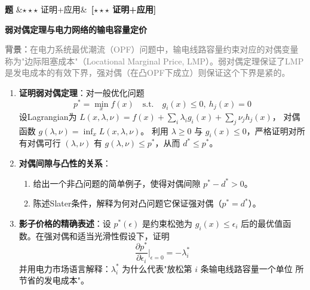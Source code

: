 \documentclass[12pt, a4paper]{article}
\newcounter{probcnt}
\newenvironment{problem}[1][]{%
  \stepcounter{probcnt}
  \begin{mdframed}[linecolor=black!30, backgroundcolor=gray!4,
    innertopmargin=8pt, innerbottommargin=8pt,
    innerleftmargin=10pt, innerrightmargin=10pt,
    skipabove=10pt, skipbelow=4pt]
  \noindent\textbf{题 \theprobcnt}\ifx&#1&\else\ \textbf{[#1]}\fi\quad
}{%
  \end{mdframed}
}
\newenvironment{subproblems}{%
  \begin{enumerate}[label=(\alph*), leftmargin=1.5em, topsep=4pt, itemsep=2pt]
}{%
  \end{enumerate}
}
\newcommand{\context}[1]{\smallskip\noindent\textcolor{gray}{\small \textbf{背景：}#1}\smallskip}
\begin{document}
\begin{problem}[$\star\star\star$ 证明+应用]
\textbf{弱对偶定理与电力网络的输电容量定价}

\context{在电力系统最优潮流（OPF）问题中，输电线路容量约束对应的对偶变量称为"边际阻塞成本"（Locational Marginal Price, LMP）。弱对偶定理保证了LMP是发电成本的有效下界，强对偶（在凸OPF下成立）则保证这个下界是紧的。}

\begin{subproblems}
  \item \textbf{证明弱对偶定理}：对一般优化问题
        \[
          p^* = \min_x f(x) \quad \text{s.t.} \quad g_i(x) \leq 0,\ h_j(x) = 0
        \]
        设Lagrangian为 $L(x,\lambda,\nu) = f(x) + \sum_i \lambda_i g_i(x) + \sum_j \nu_j h_j(x)$，
        对偶函数 $g(\lambda,\nu) = \inf_x L(x,\lambda,\nu)$。
        利用 $\lambda \geq 0$ 与 $g_i(x) \leq 0$，严格证明对所有对偶可行 $(\lambda, \nu)$ 有
        $g(\lambda, \nu) \leq p^*$，从而 $d^* \leq p^*$。

  \item \textbf{对偶间隙与凸性的关系}：
        \begin{enumerate}[label=(\roman*)]
          \item 给出一个非凸问题的简单例子，使得对偶间隙 $p^* - d^* > 0$。
          \item 陈述Slater条件，解释为何对凸问题它保证强对偶（$p^* = d^*$）。
        \end{enumerate}

  \item \textbf{影子价格的精确表述}：设 $p^*(\epsilon)$ 是约束松弛为 $g_i(x) \leq \epsilon_i$
        后的最优值函数。在强对偶和适当光滑性假设下，证明
        \[
          \frac{\partial p^*}{\partial \epsilon_i}\bigg|_{\epsilon=0} = -\lambda_i^*
        \]
        并用电力市场语言解释：$\lambda_i^*$ 为什么代表"放松第 $i$ 条输电线路容量一个单位
        所节省的发电成本"。
\end{subproblems}
\end{problem}
\end{document}
